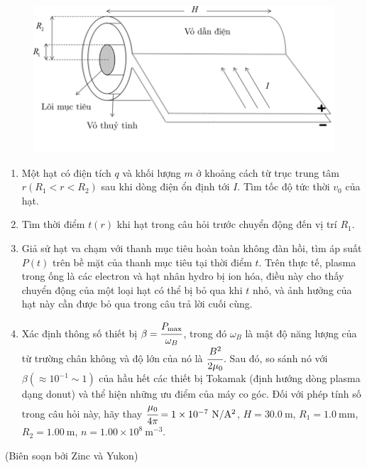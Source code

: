 \begin{figure}[!htb]
    \centering
    \includegraphics[scale=0.55]{Problem_8/P8.png}
    \label{fig_P8}
\end{figure}
\begin{enumerate}[label=\textbf{\alph*,}]\itemsep0em
\item Một hạt có điện tích $ q $ và khối lượng $ m $ ở khoảng cách từ trục trung tâm $ r \left (R_{1} <r <R_{2} \right) $ sau khi dòng điện ổn định tới $ I $. Tìm tốc độ tức thời $ v_{0} $ của hạt.    
    \item Tìm thời điểm $ t (r) $ khi hạt trong câu hỏi trước chuyển động đến vị trí $ R_{1} $.
    \item Giả sử hạt va chạm với thanh mục tiêu hoàn toàn không đàn hồi, tìm áp suất $ P (t) $ trên bề mặt của thanh mục tiêu tại thời điểm $ t $. Trên thực tế, plasma trong ống là các electron và hạt nhân hydro bị ion hóa, điều này cho thấy chuyển động của một loại hạt có thể bị bỏ qua khi $ t $ nhỏ, và ảnh hưởng của hạt này cần được bỏ qua trong câu trả lời cuối cùng.
    \item Xác định thông số thiết bị $ \beta = \cfrac {P_{\max}} {\omega_{B}} $, trong đó $ \omega_{B} $ là mật độ năng lượng của từ trường chân không và độ lớn của nó là $ \cfrac {B^{2}} {2 \mu_{0}} $. Sau đó, so sánh nó với $ \beta \left(\approx 10^{-1} \sim 1 \right) $ của hầu hết các thiết bị Tokamak (định hướng dòng plasma dạng donut) và thể hiện những ưu điểm của máy co góc. Đối với phép tính số trong câu hỏi này, hãy thay $\cfrac{\mu_{0}}{4 \pi} = 1 \times 10^{- 7} \mathrm {~N} / \mathrm {A}^{2}$, $H = 30.0 \mathrm {~m}$, $R_{1} = 1.0 \mathrm{~mm}$, $R_{2} = 1.00 \mathrm{~m}$, $n = 1.00 \times 10^{8} \mathrm {~m}^{-3}$.
\end{enumerate}

\begin{flushright}
    (Biên soạn bởi Zinc và Yukon)
\end{flushright}